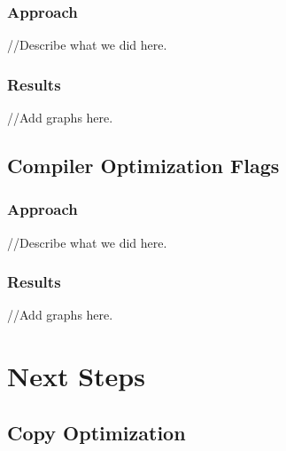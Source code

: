\documentclass[11pt]{article}
\theoremstyle{plain}
\theoremstyle{definition}
\begin{document}
\subsubsection{Approach}
//Describe what we did here.
\subsubsection{Results}
//Add graphs here.

\subsection{Compiler Optimization Flags}
\subsubsection{Approach}
//Describe what we did here.
\subsubsection{Results}
//Add graphs here.

\section{Next Steps}
\subsection{Copy Optimization}





 
 
\end{document}
